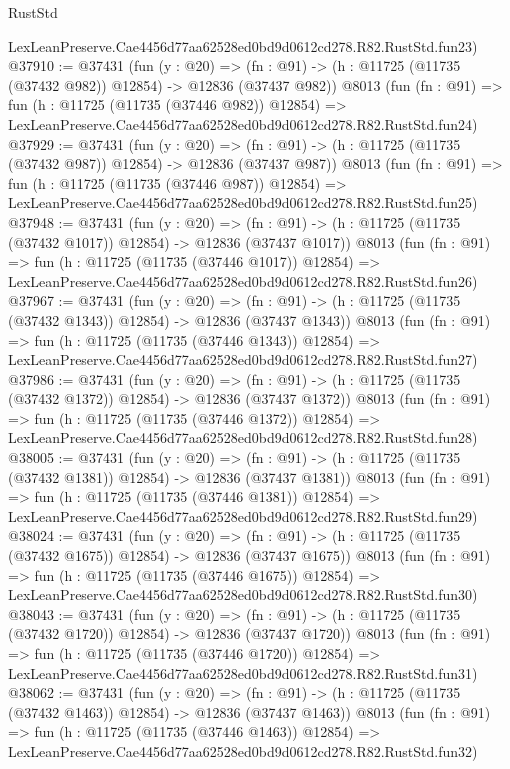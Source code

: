 \begin{lexlean}{RustStd}
\begin{coremodule}
    LexLeanPreserve.Cae4456d77aa62528ed0bd9d0612cd278.R82.RustStd.fun23)
@37910 := @37431
    (fun (y : @20) =>
    (fn : @91) -> (h : @11725 (@11735 (@37432 @982)) @12854) -> @12836 (@37437 @982))
    @8013
    (fun (fn : @91) =>
    fun (h : @11725 (@11735 (@37446 @982)) @12854) =>
    LexLeanPreserve.Cae4456d77aa62528ed0bd9d0612cd278.R82.RustStd.fun24)
@37929 := @37431
    (fun (y : @20) =>
    (fn : @91) -> (h : @11725 (@11735 (@37432 @987)) @12854) -> @12836 (@37437 @987))
    @8013
    (fun (fn : @91) =>
    fun (h : @11725 (@11735 (@37446 @987)) @12854) =>
    LexLeanPreserve.Cae4456d77aa62528ed0bd9d0612cd278.R82.RustStd.fun25)
@37948 := @37431
    (fun (y : @20) =>
    (fn : @91) -> (h : @11725 (@11735 (@37432 @1017)) @12854) -> @12836 (@37437 @1017))
    @8013
    (fun (fn : @91) =>
    fun (h : @11725 (@11735 (@37446 @1017)) @12854) =>
    LexLeanPreserve.Cae4456d77aa62528ed0bd9d0612cd278.R82.RustStd.fun26)
@37967 := @37431
    (fun (y : @20) =>
    (fn : @91) -> (h : @11725 (@11735 (@37432 @1343)) @12854) -> @12836 (@37437 @1343))
    @8013
    (fun (fn : @91) =>
    fun (h : @11725 (@11735 (@37446 @1343)) @12854) =>
    LexLeanPreserve.Cae4456d77aa62528ed0bd9d0612cd278.R82.RustStd.fun27)
@37986 := @37431
    (fun (y : @20) =>
    (fn : @91) -> (h : @11725 (@11735 (@37432 @1372)) @12854) -> @12836 (@37437 @1372))
    @8013
    (fun (fn : @91) =>
    fun (h : @11725 (@11735 (@37446 @1372)) @12854) =>
    LexLeanPreserve.Cae4456d77aa62528ed0bd9d0612cd278.R82.RustStd.fun28)
@38005 := @37431
    (fun (y : @20) =>
    (fn : @91) -> (h : @11725 (@11735 (@37432 @1381)) @12854) -> @12836 (@37437 @1381))
    @8013
    (fun (fn : @91) =>
    fun (h : @11725 (@11735 (@37446 @1381)) @12854) =>
    LexLeanPreserve.Cae4456d77aa62528ed0bd9d0612cd278.R82.RustStd.fun29)
@38024 := @37431
    (fun (y : @20) =>
    (fn : @91) -> (h : @11725 (@11735 (@37432 @1675)) @12854) -> @12836 (@37437 @1675))
    @8013
    (fun (fn : @91) =>
    fun (h : @11725 (@11735 (@37446 @1675)) @12854) =>
    LexLeanPreserve.Cae4456d77aa62528ed0bd9d0612cd278.R82.RustStd.fun30)
@38043 := @37431
    (fun (y : @20) =>
    (fn : @91) -> (h : @11725 (@11735 (@37432 @1720)) @12854) -> @12836 (@37437 @1720))
    @8013
    (fun (fn : @91) =>
    fun (h : @11725 (@11735 (@37446 @1720)) @12854) =>
    LexLeanPreserve.Cae4456d77aa62528ed0bd9d0612cd278.R82.RustStd.fun31)
@38062 := @37431
    (fun (y : @20) =>
    (fn : @91) -> (h : @11725 (@11735 (@37432 @1463)) @12854) -> @12836 (@37437 @1463))
    @8013
    (fun (fn : @91) =>
    fun (h : @11725 (@11735 (@37446 @1463)) @12854) =>
    LexLeanPreserve.Cae4456d77aa62528ed0bd9d0612cd278.R82.RustStd.fun32)

\end{coremodule}
\end{lexlean}
